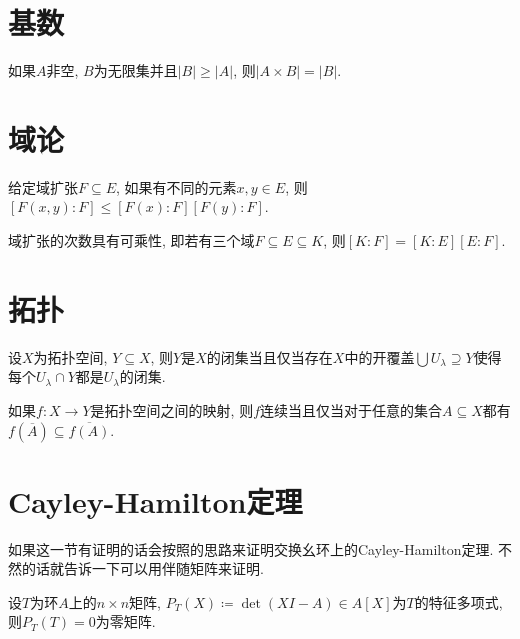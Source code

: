 
\section{基数}

\begin{proposition}\label{prop:cardcartcor}
    如果$A$非空, $B$为无限集并且$\vert B\vert\geq \vert A\vert$, 则$\vert A\times B\vert=\vert B\vert$.
\end{proposition}

\section{域论}

\begin{proposition}\label{thm:fntfieldextdegree}%
    给定域扩张$F\subseteq E$, 如果有不同的元素$x, y\in E$, 则$[F(x, y):F]\leq [F(x):F][F(y):F]$.
\end{proposition}

\begin{theorem}\label{thm:fieldextdegreemulti}%
    域扩张的次数具有可乘性, 即若有三个域$F\subseteq E\subseteq K$, 则$[K:F]=[K:E][E:F]$.
\end{theorem}

\section{拓扑}

\begin{proposition}\label{prop:closedsetlocal}
    设$X$为拓扑空间, $Y\subseteq X$, 则$Y$是$X$的闭集当且仅当存在$X$中的开覆盖$\bigcup U_\lambda\supseteq Y$使得每个$U_\lambda\cap Y$都是$U_\lambda$的闭集.
\end{proposition}

\begin{proposition}\label{prop:continuousimageclosure}
    如果$f\colon X\to Y$是拓扑空间之间的映射, 则$f$连续当且仅当对于任意的集合$A\subseteq X$都有$f(\overline{A})\subseteq\overline{f(A)}$.
\end{proposition}

\section{Cayley-Hamilton定理}

如果这一节有证明的话会按照\parencite{_trivia_2020}的思路来证明交换幺环上的Cayley-Hamilton定理. 不然的话就告诉一下可以用伴随矩阵来证明.

\begin{theorem}\label{thm:CayleyHamilton}
    设$T$为环$A$上的$n\times n$矩阵, $P_T(X)\coloneq \det (XI-A)\in A[X]$为$T$的特征多项式, 则$P_T(T)=0$为零矩阵.
\end{theorem}
